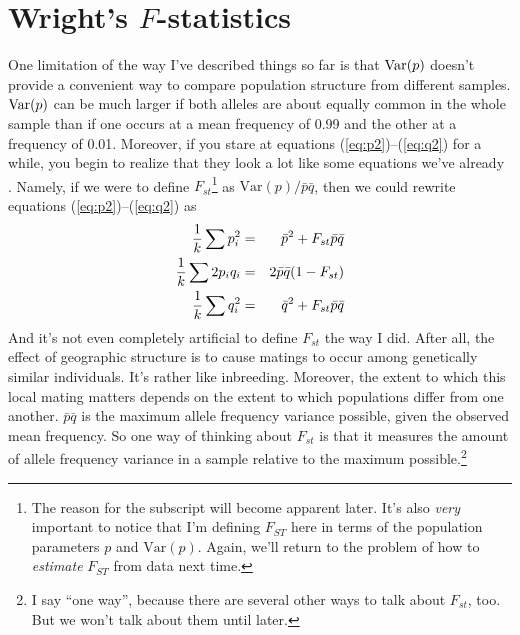 \documentclass[12pt]{article}
\begin{document}
\section*{Wright's $F$-statistics}

One limitation of the way I've described things so far is that
$\hbox{Var}(p)$ doesn't provide a convenient way to compare population
structure from different samples. $\hbox{Var}(p)$ can be much larger
if both alleles are about equally common in the whole sample than if
one occurs at a mean frequency of 0.99 and the other at a frequency of
0.01. Moreover, if you stare at equations (\ref{eq:p2})--(\ref{eq:q2})
for a while, you begin to realize that they look a lot like some
equations we've already
.
Namely, if we were to define $F_{st}$\footnote{The reason for the
  subscript will become apparent later. It's also {\it very\/}
  important to notice that I'm defining $F_{ST}$ here in terms of the
  population parameters $p$ and $\mbox{Var}(p)$. Again, we'll return
  to the problem of how to {\it estimate\/} $F_{ST}$ from data next
  time.} as $\mbox{Var}(p)/\bar p\bar q$, then we could rewrite
equations (\ref{eq:p2})--(\ref{eq:q2}) as
\begin{eqnarray}
\frac{1}{k}\sum p_i^2 &=& \bar p^2 + F_{st}\bar p \bar q \label{eq:p2-f} \\
\frac{1}{k}\sum 2p_iq_i &=& 2\bar p\bar q(1 - F_{st}) \label{eq:2pq-f} \\
\frac{1}{k}\sum q_i^2   &=& \bar q^2 + F_{st}\bar p \bar q \label{eq:q2-f}
\end{eqnarray}
And it's not even completely artificial to define $F_{st}$ the way I
did. After all, the effect of geographic structure is to cause matings
to occur among genetically similar individuals. It's rather like
inbreeding. Moreover, the extent to which this local mating matters
depends on the extent to which populations differ from one
another. $\bar p\bar q$ is the maximum allele frequency variance
possible, given the observed mean frequency. So one way of thinking
about $F_{st}$ is that it measures the amount of allele frequency
variance in a sample relative to the maximum possible.\footnote{I say
  ``one way'', because there are several other ways to talk about
  $F_{st}$, too. But we won't talk about them until later.}
\end{document}
